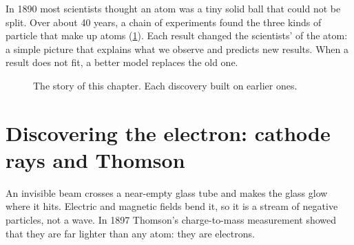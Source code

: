 In 1890 most scientists thought an atom was a tiny solid ball that could not be
split. Over about 40 years, a chain of experiments found the three kinds of
particle that make up atoms (\cref{ch2:fig:timeline}). Each result changed the scientists'
 of the atom: a simple picture that explains what we observe and
predicts new results. When a result does not fit, a better model replaces the old one.

\begin{figure}
  \centering
  \caption{The story of this chapter. Each discovery built on earlier ones.}\label{ch2:fig:timeline}
\end{figure}

\section{Discovering the electron: cathode rays and Thomson}\label{ch2:sec:electron}

\begin{bigidea}
An invisible beam crosses a near-empty glass tube and makes the glass glow where
it hits. Electric and magnetic fields bend it, so it is a stream of negative
particles, not a wave. In 1897 Thomson's charge-to-mass measurement showed that
they are far lighter than any atom: they are electrons.
\end{bigidea}

